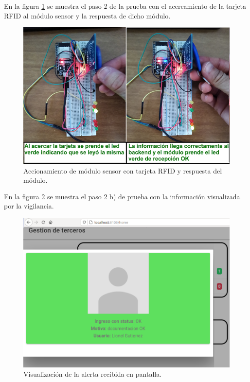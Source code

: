 En la figura \ref{fig:TestTajetaCodigoLeida2} se muestra el paso 2 de la prueba con el acercamiento de la tarjeta RFID al módulo sensor y la respuesta de dicho módulo.

\vspace{1cm}
\begin{figure}[h]
	\centering
	\includegraphics[width=1\textwidth]{./Figures/TestTajetaCodigoLeida.png}
	\caption{Accionamiento de módulo sensor con tarjeta RFID y respuesta del módulo.}
	\label{fig:TestTajetaCodigoLeida2}
\end{figure}

En la figura \ref{fig:ingresoOk} se muestra el paso 2 b) de prueba con la información visualizada por la vigilancia.

\begin{figure}[h]
	\centering
	\includegraphics[width=1\textwidth]{./Figures/ingresoOk.png}
	\caption{Visualización de la alerta recibida en pantalla.}
	\label{fig:ingresoOk}
\end{figure}

